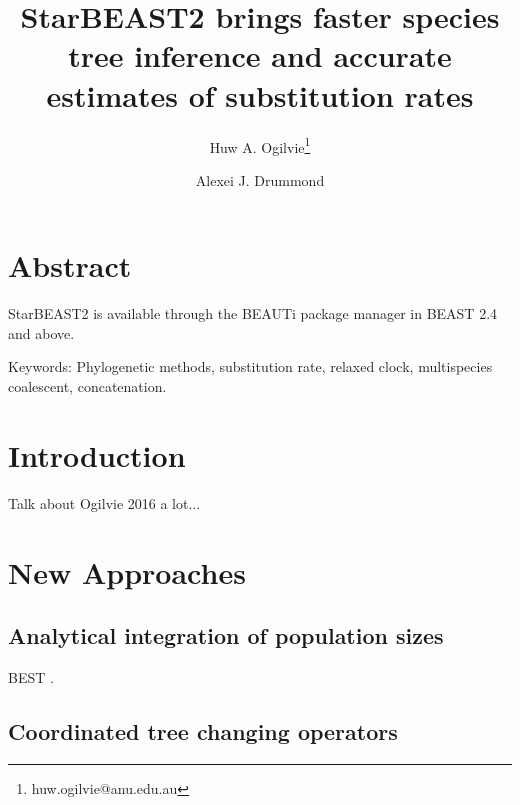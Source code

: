 \documentclass[12pt]{article}
\begin{document}
\title{StarBEAST2 brings faster species tree inference and accurate estimates of substitution rates}
\author[1,2]{Huw A. Ogilvie\thanks{huw.ogilvie@anu.edu.au}}
\author[2,3]{Alexei J. Drummond}

\maketitle

\clearpage

\justifying

\section{Abstract}

StarBEAST2 is available through the BEAUTi package manager in BEAST 2.4 and above.

Keywords: Phylogenetic methods, substitution rate, relaxed clock, multispecies coalescent, concatenation.

\section{Introduction}

Talk about Ogilvie 2016 a lot...

\section{New Approaches}

\subsection{Analytical integration of population sizes}

BEST \citep{EVO:EVO414}.

\subsection{Coordinated tree changing operators}
\end{document}
